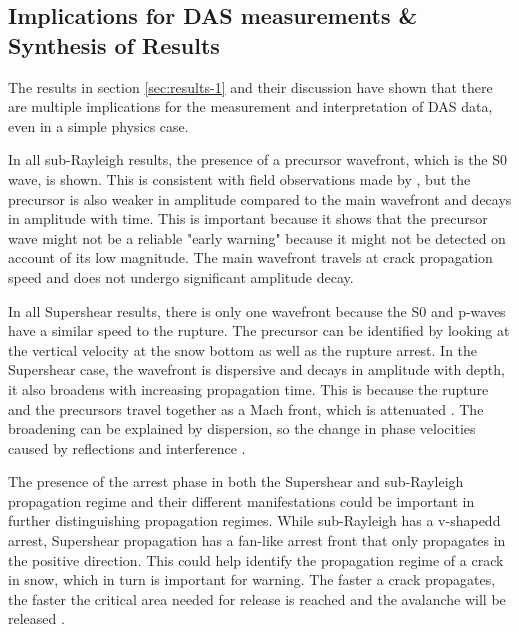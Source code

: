 \subsection{Implications for DAS measurements \& Synthesis of Results}

The results in section \ref{sec:results-1} and their discussion have shown that there are multiple implications for the measurement and interpretation of DAS data, even in a simple physics case. \par 

In all sub-Rayleigh results, the presence of a precursor wavefront, which is the S0 wave, is shown. This is consistent with field observations made by \cite{herwijnenSeismicSensorArray2011}, but the precursor is also weaker in amplitude compared to the main wavefront and decays in amplitude with time. This is important because it shows that the precursor wave might not be a reliable "early warning" because it might not be detected on account of its low magnitude. The main wavefront travels at crack propagation speed and does not undergo significant amplitude decay. \par

In all Supershear results, there is only one wavefront because the S0 and p-waves have a similar speed to the rupture. The precursor can be identified by looking at the vertical velocity at the snow bottom as well as the rupture arrest. In the Supershear case, the wavefront is dispersive and decays in amplitude with depth, it also broadens with increasing propagation time. This is because the rupture and the precursors travel together as a Mach front, which is attenuated \parencite{dunhamNearsourceGroundMotion2005}. The broadening can be explained by dispersion, so the change in phase velocities caused by reflections and interference \parencite{graffWaveMotionElastic1975}. \par

The presence of the arrest phase in both the Supershear and sub-Rayleigh propagation regime and their different manifestations could be important in further distinguishing propagation regimes. While sub-Rayleigh has a v-shapedd arrest, Supershear propagation has a fan-like arrest front that only propagates in the positive direction. This could help identify the propagation regime of a crack in snow, which in turn is important for warning. The faster a crack propagates, the faster the critical area needed for release is reached and the avalanche will be released \parencite{bergfeldSignaturesSubRayleighSupershear2025,trottetTransitionSubRayleighAnticrack2022}. \par

